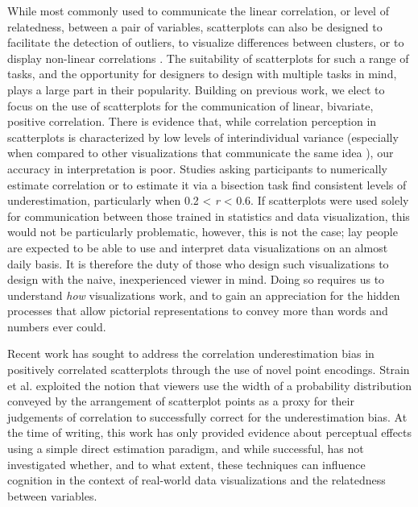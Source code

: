 \documentclass[sigconf]{acmart}
\begin{document}
While most commonly used to communicate the linear correlation, or level
of relatedness, between a pair of variables, scatterplots can also be
designed to facilitate the detection of outliers, to visualize
differences between clusters, or to display non-linear correlations
\citep{sarikaya_2018}. The suitability of scatterplots for such a range
of tasks, and the opportunity for designers to design with multiple
tasks in mind, plays a large part in their popularity. Building on
previous work, we elect to focus on the use of scatterplots for the
communication of linear, bivariate, positive correlation. There is
evidence that, while correlation perception in scatterplots is
characterized by low levels of interindividual variance (especially when
compared to other visualizations that communicate the same idea
\citep{harrison_2014, kay_2015}), our accuracy in interpretation is
poor. Studies asking participants to numerically estimate correlation
\citep{strahan_1978, bobko_1979, cleveland_1982, lane_1985, lauer_1989, collyer_1990, meyer_1992}
or to estimate it via a bisection task \citep{rensink_2017} find
consistent levels of underestimation, particularly when 0.2 \textless{}
\emph{r} \textless{} 0.6. If scatterplots were used solely for
communication between those trained in statistics and data
visualization, this would not be particularly problematic, however, this
is not the case; lay people are expected to be able to use and interpret
data visualizations on an almost daily basis. It is therefore the duty
of those who design such visualizations to design with the naive,
inexperienced viewer in mind. Doing so requires us to understand
\emph{how} visualizations work, and to gain an appreciation for the
hidden processes that allow pictorial representations to convey more
than words and numbers ever could.

Recent work has sought to address the correlation underestimation bias
in positively correlated scatterplots through the use of novel point
encodings. Strain et al. \citep{strain_2023, strain_2023b, strain_2024}
exploited the notion that viewers use the width of a probability
distribution conveyed by the arrangement of scatterplot points as a
proxy for their judgements of correlation to successfully correct for
the underestimation bias. At the time of writing, this work has only
provided evidence about perceptual effects using a simple direct
estimation paradigm, and while successful, has not investigated whether,
and to what extent, these techniques can influence cognition in the
context of real-world data visualizations and the relatedness between
variables.
\end{document}
